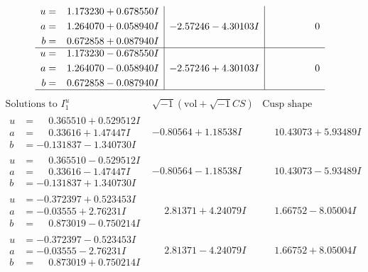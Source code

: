 \documentclass[1p]{elsarticle_modified}
\theoremstyle{definition}
\newcommand{\I}{\sqrt{-1}}
\begin{document}
$$\begin{array}{c|c|c}
\begin{aligned}
u &= \phantom{-}1.173230 + 0.678550 I \\
a &= \phantom{-}1.264070 + 0.058940 I \\
b &= \phantom{-}0.672858 + 0.087940 I\end{aligned}
 & -2.57246 - 4.30103 I & \phantom{-0.000000 } 0 \\ \hline\begin{aligned}
u &= \phantom{-}1.173230 - 0.678550 I \\
a &= \phantom{-}1.264070 - 0.058940 I \\
b &= \phantom{-}0.672858 - 0.087940 I\end{aligned}
 & -2.57246 + 4.30103 I & \phantom{-0.000000 } 0\\
 \hline 
 \end{array}$$\newpage$$\begin{array}{c|c|c}  
\text{Solutions to }I^u_{1}& \I (\text{vol} + \sqrt{-1}CS) & \text{Cusp shape}\\
 \hline 
\begin{aligned}
u &= \phantom{-}0.365510 + 0.529512 I \\
a &= \phantom{-}0.33616 + 1.47447 I \\
b &= -0.131837 - 1.340730 I\end{aligned}
 & -0.80564 + 1.18538 I & \phantom{-}10.43073 + 5.93489 I \\ \hline\begin{aligned}
u &= \phantom{-}0.365510 - 0.529512 I \\
a &= \phantom{-}0.33616 - 1.47447 I \\
b &= -0.131837 + 1.340730 I\end{aligned}
 & -0.80564 - 1.18538 I & \phantom{-}10.43073 - 5.93489 I \\ \hline\begin{aligned}
u &= -0.372397 + 0.523453 I \\
a &= -0.03555 + 2.76231 I \\
b &= \phantom{-}0.873019 - 0.750214 I\end{aligned}
 & \phantom{-}2.81371 + 4.24079 I & \phantom{-}1.66752 - 8.05004 I \\ \hline\begin{aligned}
u &= -0.372397 - 0.523453 I \\
a &= -0.03555 - 2.76231 I \\
b &= \phantom{-}0.873019 + 0.750214 I\end{aligned}
 & \phantom{-}2.81371 - 4.24079 I & \phantom{-}1.66752 + 8.05004 I \\ \hline\begin{aligned}

\end{aligned}
\end{array}$$
\end{document}

